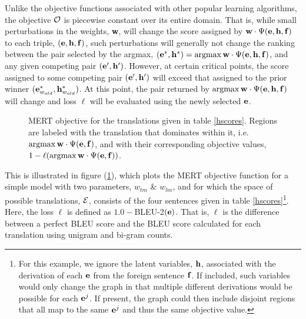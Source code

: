 \documentclass[11pt,tightenlines,kern-1pt]{article}
\DeclareMathOperator*{\argmax}{argmax}
\begin{document}
Unlike the objective functions associated with other popular learning algorithms, 
the objective \mbox{${\cal O}$} is piecewise constant over its entire domain. That is, while small perturbations in the weights, {\bf w}, will change the score assigned by \mbox{${\bf w} \cdot \Psi({\bf e}, {\bf h}, {\bf f})$} to each triple, \mbox{$({\bf e}, {\bf h}, {\bf f})$}, such perturbations will generally not change the ranking between the 
pair selected by the argmax,  \mbox{$({\bf e}^*, {\bf h}^*) = \argmax {\bf w} \cdot \Psi({\bf e}, {\bf h}, {\bf f})$}, and any given competing pair \mbox{$({\bf e}^\prime, {\bf h}^\prime)$}. However, at certain critical points, 
the score assigned to some competing pair \mbox{$({\bf e}^\prime, {\bf h}^\prime)$} will exceed that assigned to the prior winner  \mbox{$({\bf e}^*_{w_{old}}, {\bf h}^*_{w_{old}})$}. At this point, the pair returned by \mbox{$\argmax {\bf w} \cdot \Psi({\bf e}, {\bf h}, {\bf f})$} will change and loss \mbox{$\ell$} will be evaluated using the newly selected \mbox{${\bf e}$}.


\begin{figure}[h]
\begin{center}
\setlength{\epsfxsize}{3.0in}
\centerline{}
\vskip -0.15in
\caption{MERT objective for the translations given in table \ref{hscores}. Regions are labeled with the translation that dominates within it, i.e\@. \mbox{$\argmax {\bf w} \cdot \Psi({\bf e}, {\bf f})$}, and with their corresponding objective values, \mbox{$1-\ell(\argmax {\bf w} \cdot \Psi({\bf e}, {\bf f}))$}. 
\label{mertsurface}
}
\end{center}
\vskip -0.2in
\end{figure}


This is illustrated in figure (\ref{mertsurface}), which plots the MERT objective function for a simple model with two parameters, \mbox{$w_{tm}$} \& \mbox{$w_{lm}$}, and for which the space of possible translations, \mbox{${\cal E}$}, consists of the four sentences given in table \ref{hscores}\footnote{For this example, we ignore the latent variables, \mbox{${\bf h}$}, associated with the derivation of each \mbox{${\bf e}$} from the foreign sentence \mbox{${\bf f}$}. If included, such variables would only change the graph in that  multiple different derivations would be possible for each \mbox{${\bf e}^j$}. If present, the graph could then include disjoint regions that all map to the same \mbox{${\bf e}^j$} and thus the same objective value.}. Here, the loss \mbox{$\ell$} is defined as \mbox{$1.0 - $}BLEU-2\mbox{$({\bf e})$}. That is, \mbox{$\ell$} is the difference between a perfect BLEU score and the BLEU score calculated for each translation using unigram and bi-gram counts.
\end{document}
